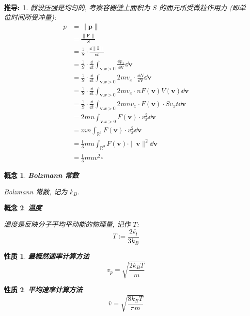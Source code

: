 \documentclass[UTF8]{ctexart}
\DeclareMathOperator{\R}{\mathbb{R}}                    %
\newcommand{\<}{\langle}
\renewcommand{\>}{\rangle}                              %
\newenvironment{dfn_box}{
    \begin{tcolorbox}[enhanced, colback=dfn_green2, boxrule=0pt, frame hidden,
        borderline west={0.7mm}{0.1mm}{dfn_green1},breakable]
    }
    {\end{tcolorbox}}
\newenvironment{ppt_box}{
    \begin{tcolorbox}[enhanced, colback=ppt_pink2, boxrule=0pt, frame hidden,
        borderline west={0.7mm}{0.1mm}{ppt_pink1},breakable]
    }
    {\end{tcolorbox}}
\newenvironment{prf_box}{
    \begin{tcolorbox}[enhanced, colback=prf_grey2, boxrule=0pt, frame hidden,
        borderline west={0.7mm}{0.1mm}{prf_grey1},breakable]
    }
    {\end{tcolorbox}}
\theoremstyle{MyStyle} %
\newtheorem{definition}{概念}[subsection]
\newenvironment{cpt}{\begin{dfn_box}\begin{definition}}{\end{definition}\end{dfn_box}}
\newtheorem{property}{性质}[definition]
\newenvironment{ppt}{\begin{ppt_box}\begin{property}}{\end{property}\end{ppt_box}}
\newtheorem*{myproof}{推导: \newline}
\newenvironment{prf}{\begin{prf_box}\begin{myproof}}{\end{myproof}\end{prf_box}}
\begin{document}
        \begin{prf}
            假设压强是均匀的, 考察容器壁上面积为 \(S\) 的面元所受微粒作用力 (即单位时间所受冲量): 
            \[
            \begin{aligned}
                p
                & = \|\bm{p}\|\\
                & = \frac{\|\bm{F}\|}{S}\\
                & = \frac{1}{S}\cdot\frac{\dd\bm{\|I\|}}{\dd t}\\
                & = \frac{1}{S}\cdot\frac{\dd}{\dd t}\int_{\bm{v}.x>0}\frac{\dd p_x}{\dd\bm{v}}\dd\bm{v}\\
                & = \frac{1}{S}\cdot\frac{\dd}{\dd t}\int_{\bm{v}.x>0}2mv_x\cdot\frac{\dd N}{\dd\bm{v}}\dd\bm{v}\\
                & = \frac{1}{S}\cdot\frac{\dd}{\dd t}\int_{\bm{v}.x>0}2mv_x\cdot n F(\bm{v})V(\bm{v})\dd\bm{v}\\
                & = \frac{1}{S}\cdot\frac{\dd}{\dd t}\int_{\bm{v}.x>0}2mnv_x\cdot F(\bm{v})\cdot S v_x t\dd\bm{v}\\
                & = 2mn\int_{\bm{v}.x>0}F(\bm{v})\cdot v_x^2\dd\bm{v}\\
                & = mn\int_{\R^3} F(\bm{v})\cdot v_x^2\dd\bm{v}\\
                & = \frac{1}{3}mn\int_{\R^3} F(\bm{v})\cdot \|\bm{v}\|^2\dd\bm{v}\\
                & = \frac{1}{3}mn\overline{v^2}\square
            \end{aligned}\]
        \end{prf}
        
        \begin{cpt}
            \textbf{Bolzmann 常数}

            Bolzmann 常数, 记为 \(k_B\). 
        \end{cpt}
        
        \begin{cpt}
            \textbf{温度}

            温度是反映分子平均平动能的物理量, 记作 \(T\): 
            \[T:=\frac{2\overline{\varepsilon_t}}{3k_B}\]
        \end{cpt}
        
        \begin{ppt}
            \textbf{最概然速率计算方法}
            \[v_p=\sqrt{\frac{2k_B T}{m}}\]
        \end{ppt}
        
        \begin{ppt}
            \textbf{平均速率计算方法}
            \[\bar{v}=\sqrt{\frac{8k_B T}{\pi m}}\]
        \end{ppt}
        
\end{document}
